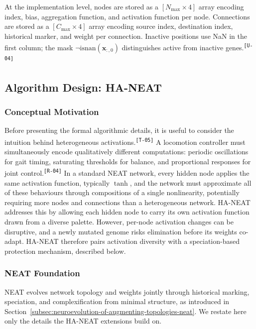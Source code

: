 \documentclass[12pt]{article}
\newcommand{\revID}[1]{\textsuperscript{\scriptsize\texttt{[#1]}}}
\newcommand{\revUnclear}[2]{\textcolor{revBlue}{#2}\revID{#1}}
\newcommand{\revRepeat}[2]{\textcolor{revTeal}{#2}\revID{#1}}
\newcommand{\revStructure}[2]{\textcolor{revAmber}{#2}\revID{#1}}
\begin{document}
At the implementation level, nodes are stored as a $[N_{\max} \times 4]$ array encoding index, bias, aggregation function, and activation function per node.
Connections are stored as a $[C_{\max} \times 4]$ array encoding source index, destination index, historical marker, and weight per connection.
\revUnclear{U-04}{Inactive positions use NaN in the first column; the mask $\neg\text{isnan}(\mathbf{x}_{:,0})$ distinguishes active from inactive genes.}


\subsection{Algorithm Design: HA-NEAT}
\label{subsec:algorithm-design-ha-neat}

\subsubsection{Conceptual Motivation}
\label{subsubsec:conceptual-motivation}

\revStructure{T-05}{Before presenting the formal algorithmic details, it is useful to consider the intuition behind heterogeneous activations.}
\revRepeat{R-04}{A locomotion controller must simultaneously encode qualitatively different computations: periodic oscillations for gait timing, saturating thresholds for balance, and proportional responses for joint control.}
In a standard NEAT network, every hidden node applies the same activation function, typically $\tanh$, and the network must approximate all of these behaviours through compositions of a single nonlinearity, potentially requiring more nodes and connections than a heterogeneous network.
HA-NEAT addresses this by allowing each hidden node to carry its own activation function drawn from a diverse palette.
However, per-node activation changes can be disruptive, and a newly mutated genome risks elimination before its weights co-adapt.
HA-NEAT therefore pairs activation diversity with a speciation-based protection mechanism, described below.

\subsubsection{NEAT Foundation}
\label{subsubsec:neat-foundation}

NEAT evolves network topology and weights jointly through historical marking, speciation, and complexification from minimal structure, as introduced in Section~\ref{subsec:neuroevolution-of-augmenting-topologies-neat}.
We restate here only the details the HA-NEAT extensions build on.
\end{document}
